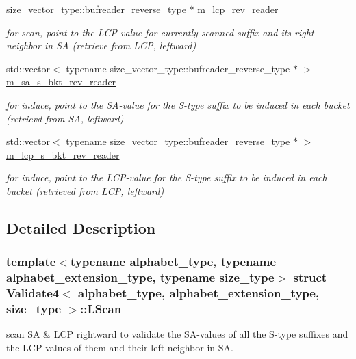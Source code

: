 \begin{DoxyCompactItemize}
size\+\_\+vector\+\_\+type\+::bufreader\+\_\+reverse\+\_\+type $\ast$ \hyperlink{struct_validate4_1_1_l_scan_ad46060df61e67075c4dd51ef65b4fbe1}{m\+\_\+lcp\+\_\+rev\+\_\+reader}
\begin{DoxyCompactList}\small\item\em for scan, point to the L\+C\+P-\/value for currently scanned suffix and its right neighbor in SA (retrieve from L\+CP, leftward) \end{DoxyCompactList}\item 
std\+::vector$<$ typename size\+\_\+vector\+\_\+type\+::bufreader\+\_\+reverse\+\_\+type $\ast$ $>$ \hyperlink{struct_validate4_1_1_l_scan_a49a126aeb7f9b315fc49b0fc5da01cb2}{m\+\_\+sa\+\_\+s\+\_\+bkt\+\_\+rev\+\_\+reader}
\begin{DoxyCompactList}\small\item\em for induce, point to the S\+A-\/value for the S-\/type suffix to be induced in each bucket (retrievd from SA, leftward) \end{DoxyCompactList}\item 
std\+::vector$<$ typename size\+\_\+vector\+\_\+type\+::bufreader\+\_\+reverse\+\_\+type $\ast$ $>$ \hyperlink{struct_validate4_1_1_l_scan_a469303775a2ce2e5199df1cad4ba121b}{m\+\_\+lcp\+\_\+s\+\_\+bkt\+\_\+rev\+\_\+reader}
\begin{DoxyCompactList}\small\item\em for induce, point to the L\+C\+P-\/value for the S-\/type suffix to be induced in each bucket (retrieved from L\+CP, leftward) \end{DoxyCompactList}\end{DoxyCompactItemize}


\subsection{Detailed Description}
\subsubsection*{template$<$typename alphabet\+\_\+type, typename alphabet\+\_\+extension\+\_\+type, typename size\+\_\+type$>$\newline
struct Validate4$<$ alphabet\+\_\+type, alphabet\+\_\+extension\+\_\+type, size\+\_\+type $>$\+::\+L\+Scan}

scan SA \& L\+CP rightward to validate the S\+A-\/values of all the S-\/type suffixes and the L\+C\+P-\/values of them and their left neighbor in SA. 

